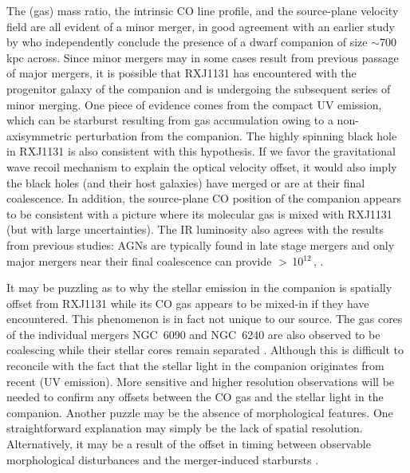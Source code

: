\documentclass[]{emulateapj}
\begin{document}
The (gas) mass ratio, the intrinsic CO line profile,  
and the source-plane velocity field are all evident of 
a minor merger, in good agreement with an 
earlier study by  who
independently conclude the presence of a dwarf companion 
of size $\sim$700\,kpc across. Since minor mergers may in some cases
result from previous passage of major mergers, it is possible that RXJ1131
has encountered with the progenitor galaxy of the companion and is undergoing 
the subsequent series of minor merging.
One piece of evidence comes from %
the compact UV emission, which can be starburst resulting from gas accumulation 
owing to a non-axisymmetric perturbation from the companion.
The highly spinning black hole in RXJ1131 is also consistent with 
this hypothesis. 
If we favor the gravitational wave recoil mechanism 
to explain the optical velocity offset, it would also imply the black 
holes (and their host galaxies) have merged or are at their final coalescence. 
In addition, the source-plane CO position of the companion appears to be consistent with 
a picture where its molecular gas is mixed with RXJ1131 (but with large uncertainties). 
The IR luminosity also agrees with 
the results from previous studies: AGNs are
typically found in late stage mergers 
\citep{Yuan10a,Iwasawa11a,Carpineti12a} and
only major mergers near their final
coalescence can provide \LIR$>$\,10$^{12}$\,\Lsun,
\citep[\eg][]{Carpineti15a,Larson16a}.

It may be puzzling as to why the stellar emission in the companion 
is spatially offset from RXJ1131 while its CO gas appears to be mixed-in if they 
have encountered.
This phenomenon is in fact not unique to our source. 
The gas cores of the individual 
mergers NGC~6090 and NGC~6240 are also observed
to be coalescing  
while their stellar cores remain
separated \citep[0.5$-$3\,kpc;][]{Bryant99a}. 
Although this is difficult to reconcile with the fact that the stellar light in the companion 
originates from recent \SF (UV emission). 
More sensitive and higher resolution observations will be needed
to confirm any offsets between the CO gas and the stellar light in the companion.
Another puzzle may be the absence of morphological features.
One straightforward explanation may simply be the lack of spatial resolution.
Alternatively, it may be a result of the offset in timing between observable
morphological disturbances and the merger-induced starbursts \citep{Lotz08a}.
\end{document}
